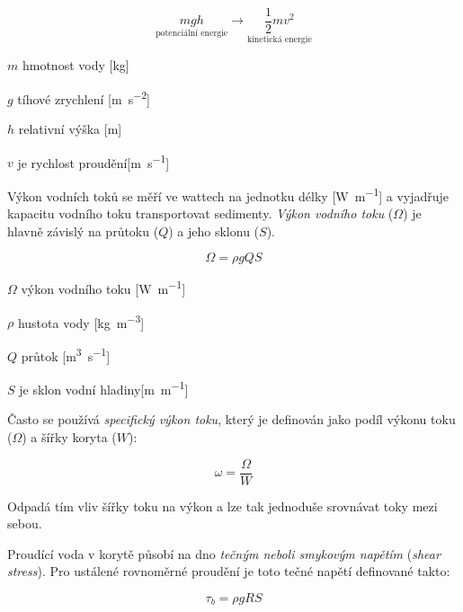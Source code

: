 \begin{equation}\label{eq:potkin}
	\underset{\text{potenciální energie}}{mgh} \longrightarrow \underset{\text{kinetická energie}}{\frac{1}{2}m v^{2}}
\end{equation}

\begin{eqexpl}
	\item{$m$} hmotnost vody [\si{\kilo\gram}]
	\item{$g$} tíhové zrychlení [\si{\metre\per\second\squared}]
	\item{$h$} relativní výška [\si{\metre}]
	\item{$v$} je rychlost proudění[\si{\metre\per\second}]
\end{eqexpl}

Výkon vodních toků se měří ve wattech na jednotku délky [\si{\watt\per\metre}] a vyjadřuje kapacitu vodního toku transportovat sedimenty. \emph{Výkon vodního toku} ($\Omega$) je hlavně závislý na průtoku ($Q$) a jeho sklonu ($S$).

\begin{equation}\label{eq:vykontoku}
	\Omega = \rho g Q S
\end{equation}

\begin{eqexpl}
	\item{$\Omega$} výkon vodního toku [\si{\watt\per\metre}]
	\item{$\rho$} hustota vody [\si{\kilogram\per\metre\cubed}]
	\item{$Q$} průtok [\si{\metre\cubed\per\second}]
	\item{$S$} je sklon vodní hladiny[\si{\metre\per\metre}]
\end{eqexpl}

Často se používá \emph{specifický výkon toku}, který je definován jako podíl výkonu toku ($\Omega$) a šířky koryta ($W$): 

\begin{equation}\label{eq:spec_vykon}
	\omega = \frac{\Omega}{W}
\end{equation}

Odpadá tím vliv šířky toku na výkon a lze tak jednoduše srovnávat toky mezi sebou. 

Proudící voda v korytě působí na dno \emph{tečným neboli smykovým napětím} (\textit{shear stress}). Pro ustálené rovnoměrné proudění je toto tečné napětí definované takto:

\begin{equation}\label{eq:tecne}
	\tau_{b} = \rho g R S
\end{equation}

